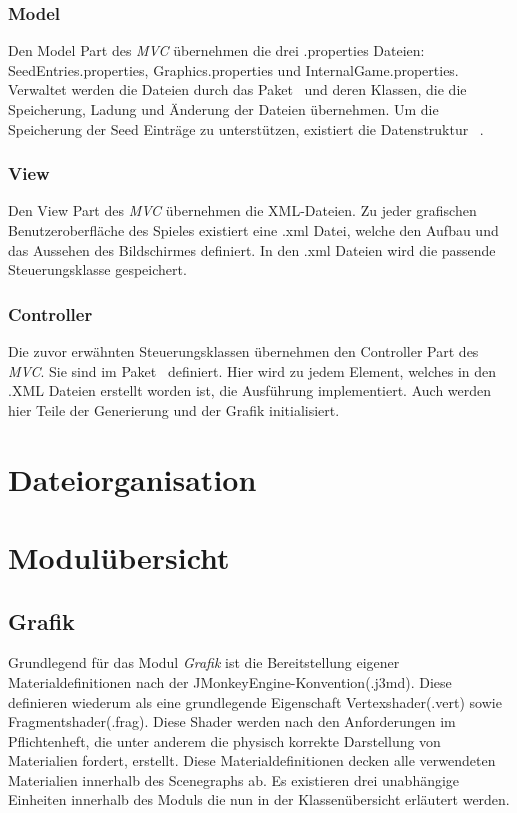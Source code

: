 \documentclass[parskip=full]{scrartcl}
\begin{document}
			\subsubsection{Model}
			Den Model Part des \textit{MVC} übernehmen die drei .properties Dateien: SeedEntries.properties,
			Graphics.properties und InternalGame.properties. Verwaltet werden die Dateien 
			durch das Paket~ und deren Klassen, die die Speicherung, 
			Ladung und Änderung der Dateien übernehmen.
			Um die Speicherung der Seed Einträge zu unterstützen, existiert die Datenstruktur
			~.
			\subsubsection{View}
			Den View Part des \textit{MVC} übernehmen die XML-Dateien. Zu jeder grafischen Benutzeroberfläche
			des Spieles existiert eine .xml Datei, welche den Aufbau und das Aussehen des 
			Bildschirmes definiert. In den .xml Dateien wird die passende 
			Steuerungsklasse gespeichert.
			\subsubsection{Controller}
			Die zuvor erwähnten Steuerungsklassen übernehmen den Controller Part des \textit{MVC}.
			Sie sind im Paket~ definiert. Hier wird zu jedem Element, 
			welches in den .XML Dateien erstellt worden ist, die Ausführung implementiert.
			Auch werden hier Teile der Generierung und der Grafik initialisiert.
	\pagebreak
	
	\section{Dateiorganisation}
	
	
	\pagebreak
	
	\pagebreak
	
	\section{Modulübersicht}
		\subsection{Grafik}

		Grundlegend für das Modul \textit{Grafik} ist die Bereitstellung eigener Materialdefinitionen nach der 
		JMonkeyEngine-Konvention(.j3md). Diese definieren wiederum als eine grundlegende 
		Eigenschaft Vertexshader(.vert) sowie Fragmentshader(.frag). Diese Shader werden nach den 
		Anforderungen im Pflichtenheft, die unter anderem die physisch korrekte Darstellung von 
		Materialien fordert, erstellt. Diese Materialdefinitionen decken alle verwendeten Materialien 
		innerhalb des Scenegraphs ab.
		Es existieren drei unabhängige Einheiten innerhalb des Moduls die nun in der Klassenübersicht
		erläutert werden.
		
\end{document}
